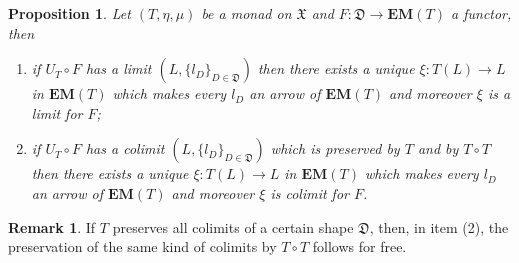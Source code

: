 \documentclass[12pt]{article}
\newtheorem{proposition}[lemma]{Proposition}
\theoremstyle{definition}
\newtheorem{remark}[lemma]{Remark}
\def\D{\mathfrak D}
\def\X{\mathfrak X}
\newcommand{\eim}[1]{\mathbf{EM}{(#1)}}
\numberwithin{equation}{section}
\begin{document}
\begin{proposition}\label{limcolim}
	Let $(T, \eta, \mu)$ be a monad on $\X$ and $F:\D\rightarrow \eim{T}$ a functor, then
	\begin{enumerate}[\rm (1)]
		\item if $U_T\circ F$ has a limit $(L, \{l_D\}_{D\in \D})$ then there exists a unique $\xi:T(L)\rightarrow L$ in $\eim{T}$ which makes every $l_D$ an arrow of $\eim{T}$ and moreover $\xi$ is a limit for $F$;
		\item if $U_T\circ F$ has a colimit $(L, \{l_D\}_{D\in \D})$ which is preserved by $T$ and by $T\circ T$ then there exists a unique $\xi:T(L)\rightarrow L$ in $\eim{T}$ which makes every $l_D$ an arrow of $\eim{T}$ and moreover $\xi$ is colimit for $F$.
	\end{enumerate} 
\end{proposition}
\begin{remark}If $T$ preserves all colimits of a certain shape $\D$, then, in item (2), the preservation of the same kind of colimits by $T\circ T$ follows for free.
\end{remark}
\end{document}
